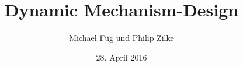 \documentclass{beamer}
\title{Dynamic Mechanism-Design}
\author{Michael F\"ug und Philip Zilke}
\date{28. April 2016}
\begin{document}
\maketitle

\frame{\tableofcontents}




\end{document}
